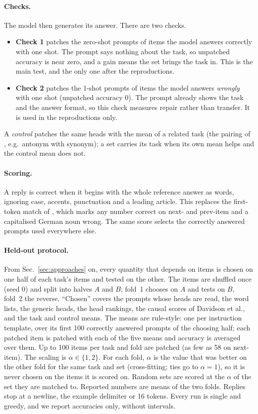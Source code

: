\documentclass[10pt,a4paper]{article}
\begin{document}
\paragraph{Checks.} The model then generates its answer. There are two checks.
\begin{itemize}
\item \textbf{Check 1} patches the zero-shot prompts of items the model answers correctly with one shot. The prompt says nothing about the task, so unpatched accuracy is near zero, and a gain means the set brings the task in. This is the main test, and the only one after the reproductions.
\item \textbf{Check 2} patches the 1-shot prompts of items the model answers \emph{wrongly} with one shot (unpatched accuracy 0). The prompt already shows the task and the answer format, so this check measures repair rather than transfer. It is used in the reproductions only.
\end{itemize}
A \emph{control} patches the same heads with the mean of a related task (the pairing of \citealp{yang2026shared}, e.g.\ antonym with synonym); a set carries its task when its own mean helps and the control mean does not.

\paragraph{Scoring.} A reply is correct when it begins with the whole reference answer as words, ignoring case, accents, punctuation and a leading article. This replaces the first-token match of \citet{yang2026shared}, which marks any number correct on next- and prev-item and a capitalised German noun wrong. The same score selects the correctly answered prompts used everywhere else.

\paragraph{Held-out protocol.} From Sec.~\ref{sec:approaches} on, every quantity that depends on items is chosen on one half of each task's items and tested on the other. The items are shuffled once (seed 0) and split into halves $A$ and $B$; fold~1 chooses on $A$ and tests on $B$, fold~2 the reverse. ``Chosen'' covers the prompts whose heads are read, the word lists, the generic heads, the head rankings, the causal scores of Davidson et al., and the task and control means. The means are rule-style: one per instruction template, over its first 100 correctly answered prompts of the choosing half; each patched item is patched with each of the five means and accuracy is averaged over them. Up to 100 items per task and fold are patched (as few as 58 on next-item). The scaling is $\alpha\in\{1,2\}$. For each fold, $\alpha$ is the value that was better on the other fold for the same task and set (cross-fitting; ties go to $\alpha=1$), so it is never chosen on the items it is scored on. Random sets are scored at the $\alpha$ of the set they are matched to. Reported numbers are means of the two folds. Replies stop at a newline, the example delimiter or 16 tokens. Every run is single and greedy, and we report accuracies only, without intervals.
\end{document}
